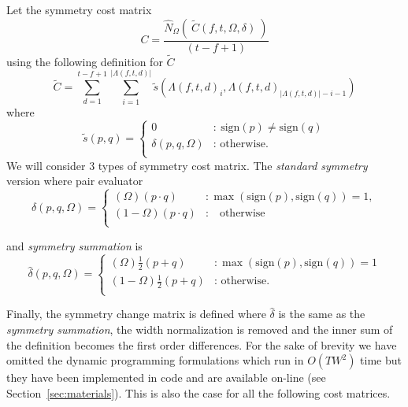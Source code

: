 \documentclass[twocolumn]{article}
\begin{document}
	Let the symmetry cost matrix
	\begin{dmath*} C = \frac{\hat N_\Omega(~ \tilde C(f, t, \Omega, \delta)~)}{(t-f+1)}\end{dmath*} using the following definition for $\tilde C$
	\begin{dmath*}\tilde C=	\sum_{d=1}^{t-f+1} 
		\sum_{i=1}^{|\Lambda( f,t,d )|} \tilde{s}(\Lambda( f,t,d )_i,\Lambda( f,t,d )_{ |\Lambda( f,t,d )|-i-1 })
	\end{dmath*}  where
\begin{dmath*}
	\tilde{s}(p,q) = 
	\left\{
	\begin{array}{lr}
		0  & : ~\mathrm{sign}( p ) \ne \mathrm{sign}( q )   \\
		\delta( p, q, \Omega ) & : \mbox{~otherwise.}  \\
	\end{array}
	\right.
\end{dmath*}
	We will consider $3$ types of symmetry cost matrix. The \textit{standard symmetry} version where pair evaluator 
		\begin{dmath*}\delta( p,q, \Omega ) = \left\{
				\begin{array}{lr}
					(\Omega) ( p \cdot q )  & : \max(\mathrm{sign}(p),\mathrm{sign}(q))=1,   \\
					 (1-\Omega) ( p \cdot q ) & :~~~\mbox{~otherwise} \\
				\end{array}
				\right.
		\end{dmath*}
		
		and \textit{symmetry summation} is
		\begin{dmath*}\hat \delta( p,q, \Omega ) = \left\{
			\begin{array}{lr}
			(\Omega) \frac{1}{2} ( p + q )	  & :  \max(\mathrm{sign}(p),\mathrm{sign}(q))=1   \\
			 (1-\Omega) \frac{1}{2} ( p + q ) & : \mbox{~otherwise.}	 \\

			\end{array}
			\right.
	\end{dmath*}
	
	Finally, the symmetry change matrix is defined where $\hat \delta$ is the same as the \textit{symmetry summation}, the width normalization is removed and the inner sum of the definition becomes the first order differences. For the sake of brevity we have omitted the dynamic programming formulations which run in $O(TW^2)$ time but they have been implemented in code and are available on-line (see Section~\ref{sec:materials}). This is also the case for all the following cost matrices.
	
\end{document}
